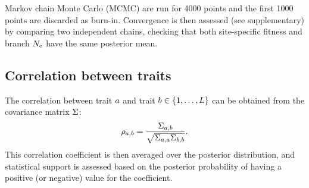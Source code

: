 \documentclass{article}
\begin{document}
Markov chain Monte Carlo (MCMC) are run for 4000 points and the first 1000 points are discarded as burn-in.
Convergence is then assessed (see supplementary) by comparing two independent chains, checking that both site-specific fitness and branch $N_{\text{e}}$ have the same posterior mean.

\subsection{Correlation between traits}
\label{sec:Correlation}
The correlation between trait $a$ and trait $b \in \{1, \hdots, L\}$ can be obtained from the covariance matrix $\Sigma$:
\begin{equation}
    \rho_{a, b} = \dfrac{\Sigma_{a, b}}{\sqrt{\Sigma_{a, a} \Sigma_{b, b}}}.
\end{equation}
This correlation coefficient is then averaged over the posterior distribution, and statistical support is assessed based on the posterior probability of having a positive (or negative) value for the coefficient.
\end{document}

